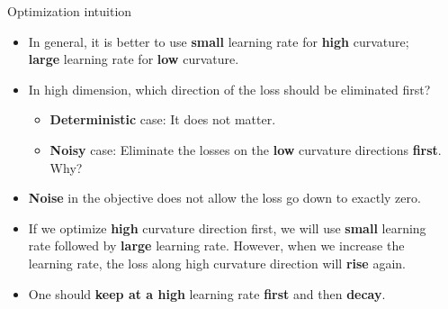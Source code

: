 \documentclass[final,t]{beamer}
\begin{document}
\begin{frame}{}
\begin{columns}[t]
\begin{column}{.32\linewidth}
\end{column}
\vspace{0pt}



\begin{column}{.32\linewidth}
    \vskip -0.5cm
    
    \begin{exampleblock}{Optimization intuition}
    \begin{itemize}
            \item In general, it is better to use \textbf{small} learning rate for \textbf{high} curvature; \textbf{large} learning rate for \textbf{low} curvature.
            \item In high dimension, which direction of the loss should be eliminated first?
            	\begin{itemize}
                \item \textbf{Deterministic} case: It does not matter.
                \item \textbf{Noisy} case:  Eliminate the losses on the \textbf{low} curvature directions \textbf{first}. Why?
                \end{itemize}
            \item \textbf{Noise} in the objective does not allow the loss go down to exactly zero. 
            \item If we optimize \textbf{high} curvature direction first, we will use \textbf{small} learning rate followed by \textbf{large} learning rate. However, when we increase the learning rate, the loss along high curvature direction will \textbf{rise} again.
            \item One should \textbf{keep at a high} learning rate \textbf{first} and then \textbf{decay}.
        \end{itemize}
    \end{exampleblock}
    
    \vspace{0.75in}
    

\end{column}
\end{columns}
\end{frame}
\end{document}
